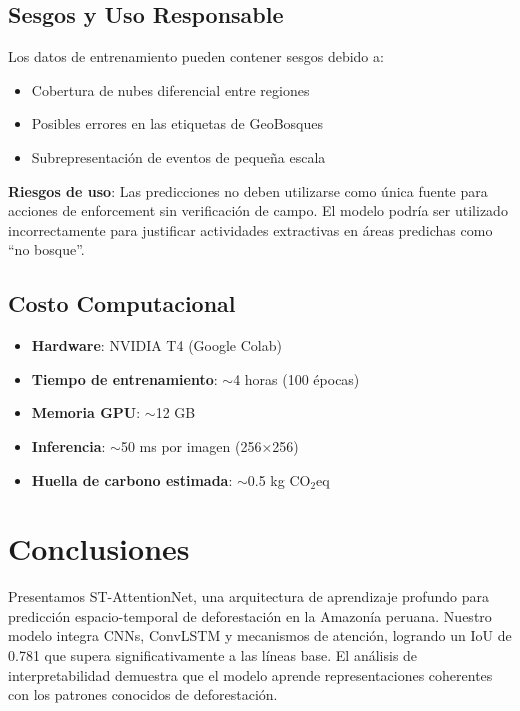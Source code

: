 \documentclass[conference]{IEEEtran}
\begin{document}
\subsection{Sesgos y Uso Responsable}

Los datos de entrenamiento pueden contener sesgos debido a:
\begin{itemize}
    \item Cobertura de nubes diferencial entre regiones
    \item Posibles errores en las etiquetas de GeoBosques
    \item Subrepresentación de eventos de pequeña escala
\end{itemize}

\textbf{Riesgos de uso}: Las predicciones no deben utilizarse como única fuente para acciones de enforcement sin verificación de campo. El modelo podría ser utilizado incorrectamente para justificar actividades extractivas en áreas predichas como ``no bosque''.

\subsection{Costo Computacional}

\begin{itemize}
    \item \textbf{Hardware}: NVIDIA T4 (Google Colab)
    \item \textbf{Tiempo de entrenamiento}: $\sim$4 horas (100 épocas)
    \item \textbf{Memoria GPU}: $\sim$12 GB
    \item \textbf{Inferencia}: $\sim$50 ms por imagen (256×256)
    \item \textbf{Huella de carbono estimada}: $\sim$0.5 kg CO$_2$eq
\end{itemize}

\section{Conclusiones}

Presentamos ST-AttentionNet, una arquitectura de aprendizaje profundo para predicción espacio-temporal de deforestación en la Amazonía peruana. Nuestro modelo integra CNNs, ConvLSTM y mecanismos de atención, logrando un IoU de 0.781 que supera significativamente a las líneas base. El análisis de interpretabilidad demuestra que el modelo aprende representaciones coherentes con los patrones conocidos de deforestación.
\end{document}
